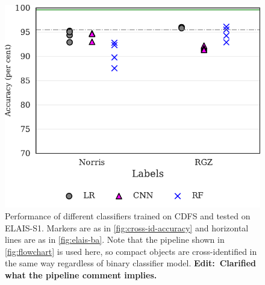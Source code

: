 \documentclass[fleqn,usenatbib,usedcolumn]{mnras}
\newcommand{\edit}[1]{{\bf Edit:~{#1}}}
\begin{document}
  \begin{figure}
    \centering
    \includegraphics[width=0.9\columnwidth]{images/elais_cross_identification_grid.pdf}
    \caption{Performance of different classifiers trained on CDFS and tested on ELAIS-S1. Markers are as in \autoref{fig:cross-id-accuracy} and horizontal lines are as in \autoref{fig:elais-ba}. Note that the pipeline shown in \autoref{fig:flowchart} is used here, so compact objects are cross-identified in the same way regardless of binary classifier model. \edit{Clarified what the pipeline comment implies.}
      \label{fig:elais-cross-id-accuracy}}
  \end{figure}
\end{document}
